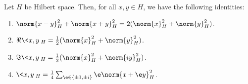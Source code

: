         \begin{corollary} \label{coro: parallelogram_law}
            Let $H$ be Hilbert space. Then, for all $x, y \in H$, we have the following identities:
            \begin{enumerate}
                \item $\norm{x - y}_H^2 + \norm{x + y}_H^2 = 2( \norm{x}_H^2 + \norm{y}_H^2 )$.
                \item $\Re \<x, y\>_H = \frac12( \norm{x}_H^2 + \norm{y}_H^2 )$.
                \item $\Im \<x, y\>_H = \frac12( \norm{x}_H^2 + \norm{iy}_H^2 )$.
                \item $\<x, y\>_H = \frac14 \sum_{\e \in \{\pm 1, \pm i\}} \e \norm{x + \e y}_H^2$.
            \end{enumerate}
        \end{corollary}
